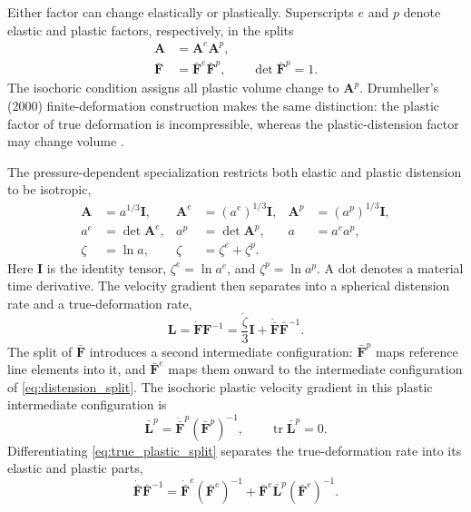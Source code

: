 \documentclass[11pt]{article}
\newcommand{\mbf}[1]{\mathbf{#1}}
\newcommand{\tr}{\operatorname{tr}}
\begin{document}
Either factor can change elastically or plastically. Superscripts \(e\) and
\(p\) denote elastic and plastic factors, respectively, in the splits
\begin{subequations}
	\label{eq:plastic_splits}
	\begin{align}
		\mbf A       & =\mbf A^e\mbf A^p,
		\label{eq:distension_plastic_split}               \\
		\bar{\mbf F} & =\bar{\mbf F}^{e}\bar{\mbf F}^{p},
		\qquad
		\det\bar{\mbf F}^{p}=1.
		\label{eq:true_plastic_split}
	\end{align}
\end{subequations}
The isochoric condition assigns all plastic volume change to \(\mbf A^p\).
Drumheller's (2000) finite-deformation construction makes the same distinction: the
plastic factor of true deformation is incompressible, whereas the plastic-distension factor
may change volume
\cite[eqs.~(71)--(74)]{drumheller2000}.

The pressure-dependent specialization restricts both elastic and plastic
distension to be isotropic,
\begin{equation*}
	\begin{aligned}
		\mbf A & =a^{1/3}\mbf I,
		       & \mbf A^e        & =(a^e)^{1/3}\mbf I,
		       & \mbf A^p        & =(a^p)^{1/3}\mbf I, \\
		a^e    & =\det\mbf A^e,
		       & a^p             & =\det\mbf A^p,
		       & a               & =a^e a^p,           \\
		\zeta  & =\ln a,
		       & \zeta           & =\zeta^e+\zeta^p.
	\end{aligned}
\end{equation*}
Here \(\mbf I\) is the identity tensor, \(\zeta^e=\ln a^e\), and
\(\zeta^p=\ln a^p\). A dot denotes a material time derivative. The velocity
gradient then separates into a spherical distension rate and a
true-deformation rate,
\begin{equation}
	\mbf L=\dot{\mbf F}\mbf F^{-1}
	=\frac{\dot\zeta}{3}\mbf I
	+\dot{\bar{\mbf F}}\bar{\mbf F}^{-1}.
	\label{eq:velocity_gradient}
\end{equation}
The split of \(\bar{\mbf F}\) introduces a second intermediate configuration:
\(\bar{\mbf F}^{p}\) maps reference line elements into it, and
\(\bar{\mbf F}^{e}\) maps them onward to the intermediate configuration of
\eqref{eq:distension_split}. The isochoric plastic velocity gradient in this
plastic intermediate configuration is
\begin{equation*}
	\bar{\mbf L}^{p}
	=\dot{\bar{\mbf F}}^{p}(\bar{\mbf F}^{p})^{-1},
	\qquad
	\tr\bar{\mbf L}^{p}=0.
\end{equation*}
Differentiating \eqref{eq:true_plastic_split} separates the true-deformation
rate into its elastic and plastic parts,
\begin{equation}
	\dot{\bar{\mbf F}}\bar{\mbf F}^{-1}
	=\dot{\bar{\mbf F}}^{e}(\bar{\mbf F}^{e})^{-1}
	+\bar{\mbf F}^{e}\bar{\mbf L}^{p}
	(\bar{\mbf F}^{e})^{-1}.
	\label{eq:true_rate_split}
\end{equation}
\end{document}
